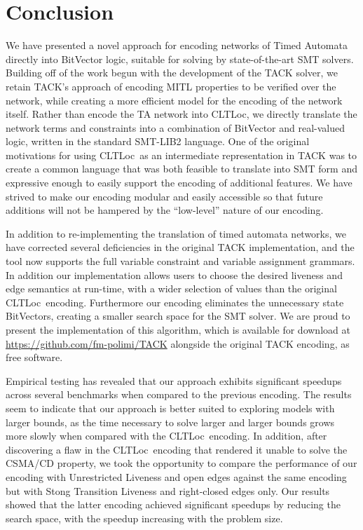 \documentclass[a4paper,11pt]{report}
\theoremstyle{definition}
\newcommand{\cltloc}{CLTLoc}
\begin{document}
\chapter{Conclusion}\label{conclusion}

We have presented a novel approach for encoding networks of Timed Automata
directly into BitVector logic, suitable for solving by state-of-the-art SMT
solvers. Building off of the work begun with the development of the TACK solver,
we retain TACK's approach of encoding MITL properties to be verified over the
network, while creating a more efficient model for the encoding of the network
itself. Rather than encode the TA network into \cltloc, we directly translate
the network terms and constraints into a combination of BitVector and
real-valued logic, written in the standard SMT-LIB2 language. One of the
original motivations for using \cltloc\ as an intermediate representation in
TACK was to create a common language that was both feasible to translate into
SMT form and expressive enough to easily support the encoding of additional
features. We have strived to make our encoding modular and easily accessible so
that future additions will not be hampered by the ``low-level'' nature of our
encoding.

In addition to re-implementing the translation of timed automata networks, we
have corrected several deficiencies in the original TACK implementation, and the
tool now supports the full variable constraint and variable assignment grammars.
In addition our implementation allows users to choose the desired liveness and
edge semantics at run-time, with a wider selection of values than the original
\cltloc\ encoding. Furthermore our encoding eliminates the unnecessary state
BitVectors, creating a smaller search space for the SMT solver. We are proud to
present the implementation of this algorithm, which is available for download at
\url{https://github.com/fm-polimi/TACK} alongside the original TACK encoding, as
free software.

Empirical testing has revealed that our approach exhibits significant speedups
across several benchmarks when compared to the previous encoding. The results
seem to indicate that our approach is better suited to exploring models with
larger bounds, as the time necessary to solve larger and larger bounds grows
more slowly when compared with the \cltloc\ encoding. In addition, after
discovering a flaw in the \cltloc\ encoding that rendered it unable to solve the
CSMA/CD property, we took the opportunity to compare the performance of our
encoding with Unrestricted Liveness and open edges against the same encoding but
with Stong Transition Liveness and right-closed edges only. Our results showed
that the latter encoding achieved significant speedups by reducing the search
space, with the speedup increasing with the problem size.
\end{document}
